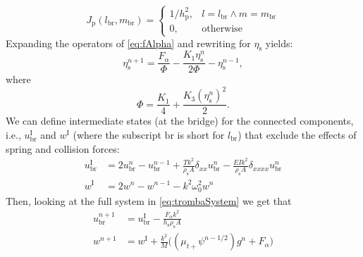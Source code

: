 \documentclass{article}
\begin{document}
\begin{equation}
J_\text{p}(l_\text{br}, m_\text{br})=
    \begin{cases}
        1/h_\text{p}^2, & l = l_\text{br} \wedge m = m_\text{br}\\
        0, & \text{otherwise}
    \end{cases}
\end{equation}
Expanding the operators of \eqref{eq:fAlpha} and rewriting for $\eta_\text{s}$ yields:
\begin{equation}\label{eq:etaNextSpring}
    \eta_\text{s}^{n+1} = \frac{F_\alpha}{\Phi}-\frac{K_1\eta_\text{s}^n}{2\Phi}-\eta_\text{s}^{n-1},
\end{equation}
where 
\begin{equation}
    \Phi = \frac{K_1}{4}+\frac{K_3(\eta_\text{s}^n)^2}{2}.
\end{equation}
We can define intermediate states (at the bridge) for the connected components, i.e., $u^\text{I}_\text{br}$ and $w^\text{I}$ (where the subscript $\text{br}$ is short for $l_\text{br}$) that exclude the effects of spring and collision forces:
\begin{subequations}\label{eq:intermediate}
    \begin{align}
        u^\text{I}_\text{br} &= 2u_\text{br}^n-u_\text{br}^{n-1}+\frac{Tk^2}{\rho_\text{s}A}\delta_{xx}u_\text{br}^n-\frac{EIk^2}{\rho_\text{s}A}\delta_{xxxx}u_\text{br}^n\\
        w^\text{I} &= 2w^n-w^{n-1}-k^2\omega_0^2w^n%
    \end{align}
\end{subequations}
Then, looking at the full system in \eqref{eq:trombaSystem} we get that
\begin{subequations}\label{eq:systemNP1NoDamp}
    \begin{align}
        u_\text{br}^{n+1}&=u_\text{br}^\text{I} - \frac{F_\alpha k^2}{h_\text{s}\rho_\text{s}A}\\
        w^{n+1} &= w^\text{I} + \frac{k^2}{M}\big((\mu_{t+}\psi^{n-1/2})g^n + F_\alpha\big)\label{eq:massNP1}\\
    \end{align}
\end{subequations}
\end{document}
